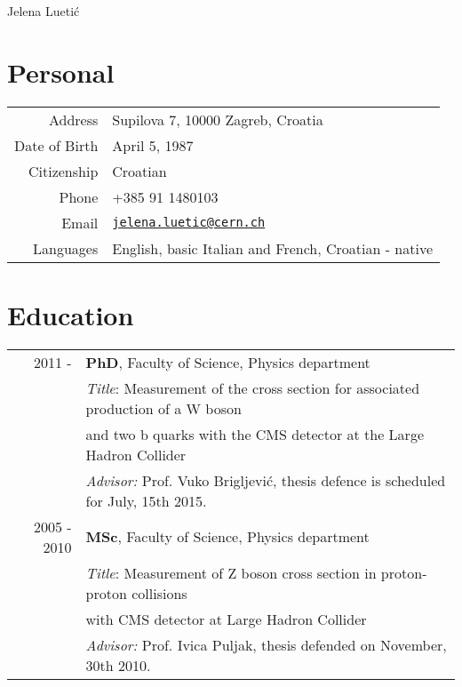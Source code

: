 \documentclass[letterpaper,12pt]{article}
\def\name{Jelena Luetić}
\begin{document}
{\huge \name}


\vspace{0.25in}


\section*{Personal}


  \begin{tabular}{r|l}
	Address & Supilova 7, 10000 Zagreb, Croatia \\[5pt]   
    Date of Birth & April 5, 1987 \\[5pt]
    Citizenship & Croatian \\[5pt]    
    Phone & +385 91 1480103 \\[5pt]
    Email & \href{mailto:jelena.luetic@cern.ch}{\tt jelena.luetic@cern.ch} \\[5pt]
    Languages & English, basic Italian and French, Croatian - native \\
  \end{tabular}



\section*{Education}

\begin{table}[h!]
 \centering
\begin{tabular}{r | l}
2011 - & \textbf{PhD}, Faculty of Science, Physics department \\ & \textit{Title}: 
Measurement of the cross section for associated production of a W boson \\ & and two b quarks with the CMS detector at the Large Hadron Collider \\ &  \textit{Advisor:} Prof. Vuko Brigljević, thesis defence is scheduled for July, 15th 2015. \\[5pt] 
2005 - 2010 & \textbf{MSc}, Faculty of Science, Physics department \\  & \textit{Title}: Measurement of Z boson cross section in proton-proton collisions \\ & with CMS detector at Large Hadron Collider \\ &  \textit{Advisor:} Prof. Ivica Puljak, thesis defended on November, 30th 2010. \\ 
\end{tabular}
\end{table}
\end{document}
